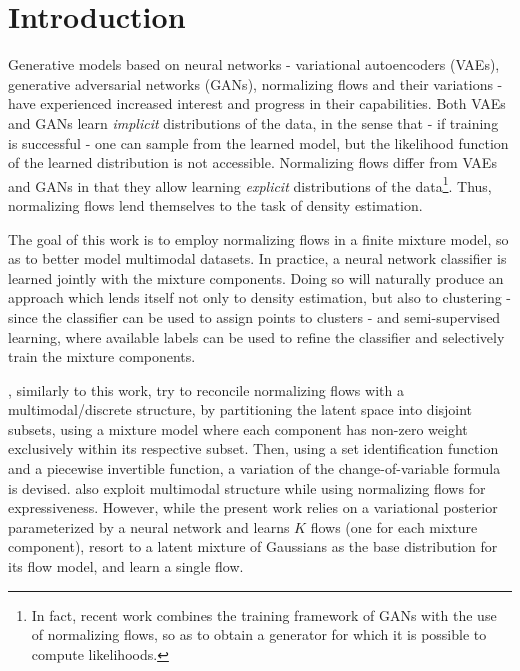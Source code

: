 \section{Introduction}
\label{section:introduction}

Generative models based on neural networks - variational autoencoders (VAEs),
generative adversarial networks (GANs), normalizing flows and their variations -
have experienced increased interest and progress in their capabilities. Both VAEs and GANs learn
\emph{implicit} distributions of the data, in the sense that - if training is
successful - one can sample from the learned model, but the likelihood function
of the learned distribution is not accessible. Normalizing flows differ from VAEs
and GANs in that they allow learning \emph{explicit} distributions of the
data\footnote{In fact, recent work \autocite{flowgan} combines the training
framework of GANs with the use of normalizing flows, so as to obtain a generator
for which it is possible to compute likelihoods.}. Thus, normalizing flows lend
themselves to the task of density estimation.

The goal of this work is to employ normalizing flows in a finite mixture model, 
so as to better model multimodal datasets. In practice, a neural network classifier
is learned jointly with the mixture components. Doing so will naturally produce
an approach which lends itself not only to density estimation, but also to
clustering - since the classifier can be used to assign points to clusters - and
semi-supervised learning, where available labels can be used to refine the classifier
and selectively train the mixture components.

\textcite{RAD}, similarly to this work, try to reconcile normalizing flows with a
multimodal/discrete structure, by partitioning the latent space into disjoint
subsets, using a mixture model where each component has non-zero weight
exclusively within its respective subset. Then, using a set identification
function and a piecewise invertible function, a variation of the change-of-variable
formula is devised.
\textcite{semisuplearning_nflows} also exploit multimodal structure while
using normalizing flows for expressiveness. However, while the present work relies on
a variational posterior parameterized by a neural network and learns $K$ flows
(one for each mixture component), \textcite{semisuplearning_nflows} resort to a
latent mixture of Gaussians as the base distribution for its flow model, and
learn a single flow.
